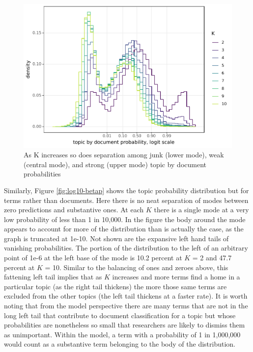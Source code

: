 \documentclass[]{book}
\theoremstyle{definition}
\theoremstyle{definition}
\theoremstyle{definition}
\theoremstyle{remark}
\begin{document}
\begin{figure}

{\centering \includegraphics[width=0.9\linewidth]{03_files/figure-latex/logit-theta-1} 

}

\caption{As K increases so does separation among junk (lower mode), weak (central mode), and strong (upper mode) topic by document probabilities}\label{fig:logit-theta}
\end{figure}

Similarly, Figure \ref{fig:log10-betap} shows the topic probability
distribution but for terms rather than documents. Here there is no neat
separation of modes between zero predictions and substantive ones. At
each \(K\) there is a single mode at a very low probability of less than
1 in 10,000. In the figure the body around the mode appears to account
for more of the distribution than is actually the case, as the graph is
truncated at 1e-10. Not shown are the expansive left hand tails of
vanishing probabilities. The portion of the distribution to the left of
an arbitrary point of 1e-6 at the left base of the mode is 10.2 percent
at \(K\) = 2 and 47.7 percent at \(K\) = 10. Similar to the balancing of
ones and zeroes above, this fattening left tail implies that as \(K\)
increases and more terms find a home in a particular topic (as the right
tail thickens) the more those same terms are excluded from the other
topics (the left tail thickens at a faster rate). It is worth noting
that from the model perspective there are many terms that are not in the
long left tail that contribute to document classification for a topic
but whose probabilities are nonetheless so small that researchers are
likely to dismiss them as unimportant. Within the model, a term with a
probability of 1 in 1,000,000 would count as a substantive term
belonging to the body of the distribution.
\end{document}
